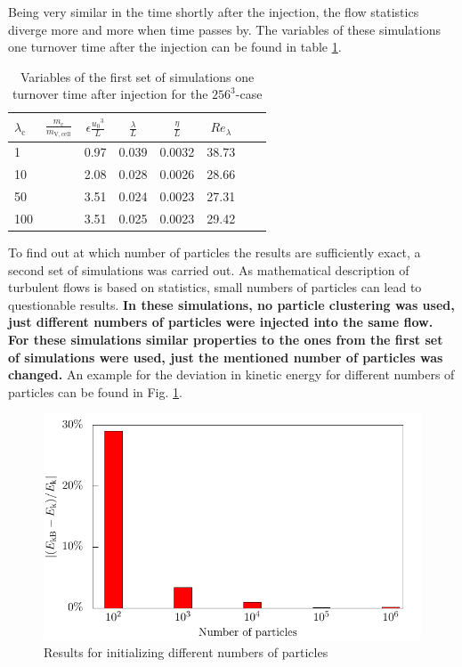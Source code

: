 \documentclass[11pt,a4paper,openany,oneside,parskip=half*]{article}
\begin{document}
\newline
Being very similar in the time shortly after the injection, the flow statistics diverge more and more when time passes by. The variables of these simulations one turnover time after the injection can be found in table \ref{table_properties}. 
\begin{table}[h]
\begin{center}
\begin{tabular}{l l | c c c c c c }
$\lambda_\mathrm{c}$& $\frac{m_\mathrm{c}}{m_\mathrm{V,cell}}$ & $\epsilon \frac{{u_0}^3}{L}$ & $\frac{\lambda}{L}$ & $\frac{\eta}{L} $ & $Re_\lambda$ \\
\hline
\hline
1 & & 0.97& 0.039 & 0.0032 & 38.73 &\\
10 & & 2.08 & 0.028 & 0.0026 & 28.66 &\\
50 & & 3.51 & 0.024 & 0.0023 & 27.31 &\\
100 & & 3.51 & 0.025 & 0.0023 & 29.42 &\\
\hline
\end{tabular}
\caption{Variables of the first set of simulations one turnover time after injection for the $256^3$-case}
\label{table_properties}
\end{center}
\end{table}
\newline
To find out at which number of particles the results are sufficiently exact, a second set of simulations was carried out. As mathematical description of turbulent flows is based on statistics, small numbers of particles can lead to questionable results. \textbf{In these simulations, no particle clustering was used, just different numbers of particles were injected into the same flow. For these simulations similar properties to the ones from the first set of simulations were used, just the mentioned number of particles was changed.} An example for the deviation in kinetic energy for different numbers of particles can be found in Fig. \ref{kineticEnergy_numberOfParticles}. 
\begin{figure}[h]
	\centering
  \includegraphics[width=\textwidth]{./../Simulationsergebnisse/variationPartikelAnzahl/128/kineticEnergy_numberOfParticles.pdf}
	\caption{Results for initializing different numbers of particles}
	\label{kineticEnergy_numberOfParticles}
\end{figure}
\end{document}
